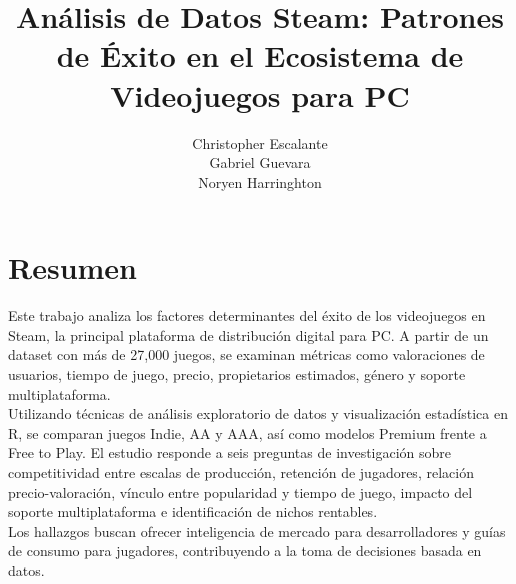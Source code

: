 \documentclass[oneside,11pt]{Latex/Classes/PhDthesisPSnPDF}
\title{Análisis de Datos Steam: Patrones de Éxito en el Ecosistema de
Videojuegos para PC}
\author{Christopher Escalante \\ Gabriel Guevara \\ Noryen Harringhton}
\begin{document}
\maketitle

\frontmatter


\setcounter{secnumdepth}{3}
\setcounter{tocdepth}{3}

\tableofcontents



\cleardoublepage

  \cleardoublepage       %
  \chapter*{Resumen}     %
  
  Este trabajo analiza los factores determinantes del éxito de los
videojuegos en Steam, la principal plataforma de distribución digital
para PC. A partir de un dataset con más de 27,000 juegos, se examinan
métricas como valoraciones de usuarios, tiempo de juego, precio,
propietarios estimados, género y soporte multiplataforma.\\

Utilizando técnicas de análisis exploratorio de datos y visualización
estadística en R, se comparan juegos Indie, AA y AAA, así como modelos
Premium frente a Free to Play. El estudio responde a seis preguntas de
investigación sobre competitividad entre escalas de producción,
retención de jugadores, relación precio-valoración, vínculo entre
popularidad y tiempo de juego, impacto del soporte multiplataforma e
identificación de nichos rentables.\\

Los hallazgos buscan ofrecer inteligencia de mercado para
desarrolladores y guías de consumo para jugadores, contribuyendo a la
toma de decisiones basada en
datos.             %
  
\end{document}
